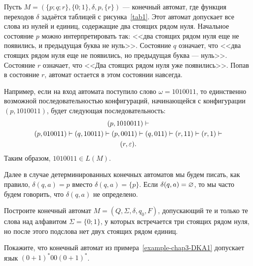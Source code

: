 \begin{myexample}
\label{example-chap3-DKA1}
Пусть $M=(\{p;q;r\},\{0;1\},\delta,p,\{r\})$ --- конечный автомат, где функция переходов $\delta$ задаётся таблицей с рисунка~\ref{tab1}.
Этот автомат допускает все слова из нулей и единиц, содержащие два стоящих рядом нуля. Начальное состояние $p$ можно интерпретировать так: <<два стоящих рядом нуля еще не появились, и предыдущая буква не нуль>>. Состояние $q$ означает, что <<два стоящих рядом нуля еще не появились, но предыдущая буква --- нуль>>. Состояние $r$ означает, что <<Два стоящих рядом нуля уже появились>>. Попав в состояние $r$, автомат остается в этом состоянии навсегда.



Например, если на вход автомата поступило слово $\omega=1010011$, то единственно возможной последовательностью конфигураций, начинающейся с конфигурации $(p,1010011)$, будет следующая последовательность:
\begin{multline*}
(p,1010011)
    \vdash\\(p,010011)
    \vdash(q,10011)
    \vdash(p,0011)
    \vdash(q,011)
    \vdash(r,11)
    \vdash(r,1)
    \vdash\\(r,\varepsilon).
\end{multline*}
Таким образом, $1010011\in L(M)$.
\end{myexample}

Далее в случае детерминированных конечных автоматов мы будем писать, как правило, $\delta(q,a)=p$ вместо $\delta(q,a)=\{p\}$. Если $\delta(q,a)=\varnothing$, то мы часто будем говорить, что $\delta(q,a)$ не определено.

\begin{myproblem}
Построите конечный автомат $M=(Q,\Sigma,\delta,q_0,F)$, допускающий те и только те слова над алфавитом $\Sigma=\{0;1\}$, у которых встречается три стоящих рядом нуля, но после этого подслова нет двух стоящих рядом единиц.
\end{myproblem}

\begin{myproblem}
Покажите, что конечный автомат из примера~\ref{example-chap3-DKA1} допускает язык $(0+1)^*00(0+1)^*$.
\end{myproblem}


